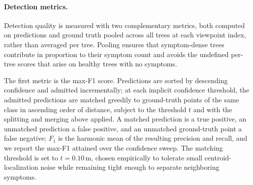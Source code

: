 
\paragraph{Detection metrics.}
Detection quality is measured with two complementary metrics, both computed
on predictions and ground truth pooled across all trees at each viewpoint
index, rather than averaged per tree.
Pooling ensures that symptom-dense trees contribute in proportion to their
symptom count and avoids the undefined per-tree scores that arise on
healthy trees with no symptoms.

The first metric is the max-F1 score.
Predictions are sorted by descending confidence and admitted incrementally;
at each implicit confidence threshold, the admitted predictions are matched
greedily to ground-truth points of the same class in ascending order of
distance, subject to the threshold $t$ and with the splitting and merging
above applied.
A matched prediction is a true positive, an unmatched prediction a false
positive, and an unmatched ground-truth point a false negative; $F_1$ is
the harmonic mean of the resulting precision and recall, and we report the
max-F1 attained over the confidence sweep.
The matching threshold is set to $t = 0.10$\,m, chosen empirically to
tolerate small centroid-localization noise while remaining tight enough to
separate neighboring symptoms.

